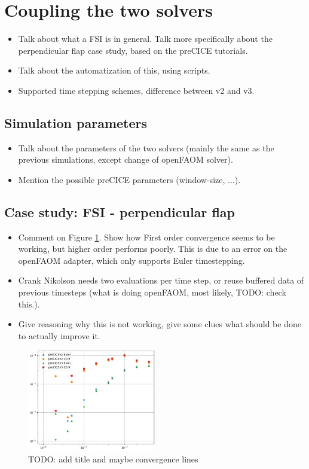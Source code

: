 \documentclass[
  english,        %
  font=times,     %
  onecolumn,      %
]{tumarticle}
\begin{document}
\section{Coupling the two solvers}
\begin{itemize}
    \item Talk about what a FSI is in general. Talk more specifically about the perpendicular flap case study, based on the preCICE tutorials.
    \item Talk about the automatization of this, using scripts.
    \item Supported time stepping schemes, difference between v2 and v3.
\end{itemize}
\subsection{Simulation parameters}
    \begin{itemize}
    \item Talk about the parameters of the two solvers (mainly the same as the previous simulations, except change of openFAOM solver). 
    \item Mention the possible preCICE parameters (window-size, ...).
    \end{itemize} 

\subsection{Case study: FSI - perpendicular flap}
\begin{itemize}
    \item Comment on Figure \ref{fig:coupled_v2_v3}. Show how First order convergence seems to be working, but higher order performs poorly. This is due to an error on the openFAOM adapter, which only supports Euler timestepping.
    \item Crank Nikolson needs two evaluations per time step, or reuse buffered data of previous timesteps (what is doing openFAOM, most likely, TODO: check this.).
    \item Give reasoning why this is not working, give some clues what should be done to actually improve it.
\end{itemize}


\begin{figure}[!ht]
    \centering
    \includegraphics[width=0.5\textwidth]{resources/coupled_v2_v3_results.PNG}
    \caption{TODO: add title and maybe convergence lines}
    \label{fig:coupled_v2_v3}
\end{figure}
\end{document}
